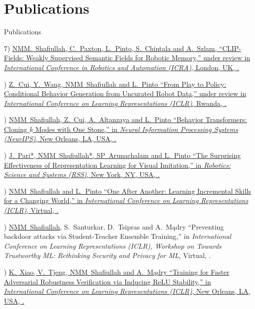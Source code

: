 \section{Publications}
{Publications}

7)\BibSpace
\href{https://mahis.life/clip-fields}
{\underline{NMM.~Shafiullah}, C.~Paxton, L.~Pinto, S.~Chintala and A.~Szlam,
``CLIP-Fields: Weakly Supervised Semantic Fields for Robotic Memory,''
under review in \textit{International Conference in Robotics and Automation (ICRA)},
London, UK,
.}

)\BibSpace
\href{https://play-to-policy.github.io}
{Z.~Cui, Y.~Wang, \underline{NMM~Shafiullah} and L.~Pinto
``From Play to Policy: Conditional Behavior Generation from Uncurated Robot Data,''
under review in \textit{International Conference  on Learning Representations (ICLR)},
Rwanda,
.}

)\BibSpace
\href{https://mahis.life/bet}
{\underline{NMM~Shafiullah}, Z.~Cui, A.~Altanzaya and L.~Pinto
``Behavior Transformers: Cloning $k$ Modes with One Stone,''
in \textit{Neural Information Processing Systems (NeurIPS)},
New Orleans, LA, USA,
.}

)\BibSpace
\href{https://jyopari.github.io/VINN}
{J.~Pari*, \underline{NMM~Shafiullah}*, SP~Arunachalam and L.~Pinto
``The Surprising Effectiveness of Representation Learning for Visual Imitation,''
in \textit{Robotics: Science and Systems (RSS)},
New York, NY, USA,
.}

)\BibSpace
\href{https://mahis.life/disk}
{\underline{NMM~Shafiullah} and L.~Pinto
``One After Another: Learning Incremental Skills for a Changing World,''
in \textit{International Conference on Learning Representations (ICLR)},
Virtual,
.}

)\BibSpace
{\underline{NMM~Shafiullah}, S.~Santurkar, D.~Tsipras and A.~M\k{a}dry
``Preventing backdoor attacks via Student-Teacher Ensemble Training,''
in \textit{International Conference on Learning Representations (ICLR), Workshop on Towards Trustworthy ML: Rethinking Security and Privacy for ML},
Virtual,
.}

)\BibSpace
\href{https://arxiv.org/pdf/1809.03008.pdf}
{K.~Xiao, V.~Tjeng, \underline{NMM~Shafiullah} and A.~M\k{a}dry
``Training for Faster Adversarial Robustness Verification via Inducing ReLU Stability,''
in \textit{International Conference on Learning Representations (ICLR)},
New Orleans, LA, USA,
.}